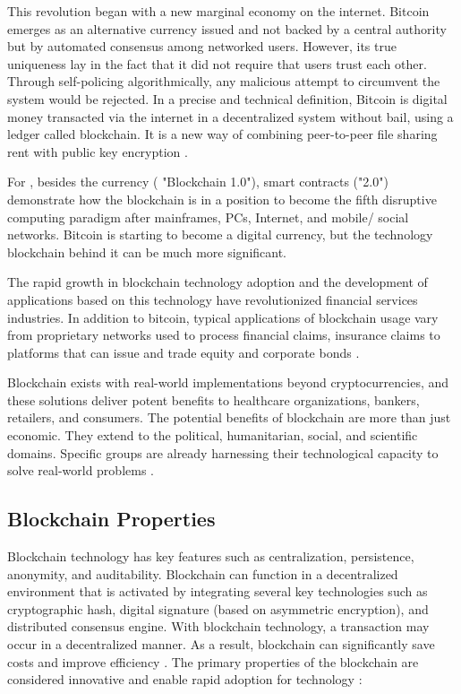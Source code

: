 This revolution began with a new marginal economy on the internet. Bitcoin emerges as an alternative currency issued and not backed by a central authority but by automated consensus among networked users. However, its true uniqueness lay in the fact that it did not require that users trust each other. Through self-policing algorithmically, any malicious attempt to circumvent the system would be rejected. In a precise and technical definition, Bitcoin is digital money transacted via the internet in a decentralized system without bail, using a ledger called blockchain. It is a new way of combining peer-to-peer file sharing rent with public key encryption \cite{swan2015blockchain}.

For \cite{swan2015blockchain}, besides the currency ( "Blockchain 1.0"), smart contracts ("2.0") demonstrate how the blockchain is in a position to become the fifth disruptive computing paradigm after mainframes, PCs, Internet, and mobile/ social networks. Bitcoin is starting to become a digital currency, but the technology blockchain behind it can be much more significant.

The rapid growth in blockchain technology adoption and the development of applications based on this technology have revolutionized financial services industries. In addition to bitcoin, typical applications of blockchain usage vary from proprietary networks used to process financial claims, insurance claims to platforms that can issue and trade equity and corporate bonds \cite{michael2018blockchain}.

Blockchain exists with real-world implementations beyond cryptocurrencies, and these solutions deliver potent benefits to healthcare organizations, bankers, retailers, and consumers. The potential benefits of blockchain are more than just economic. They extend to the political, humanitarian, social, and scientific domains. Specific groups are already harnessing their technological capacity to solve real-world problems \cite{michael2018blockchain}.



\subsection{Blockchain Properties}\label{sec:propriedades}

Blockchain technology has key features such as centralization, persistence, anonymity, and auditability. Blockchain can function in a decentralized environment that is activated by integrating several key technologies such as cryptographic hash, digital signature (based on asymmetric encryption), and distributed consensus engine. With blockchain technology, a transaction may occur in a decentralized manner. As a result, blockchain can significantly save costs and improve efficiency \cite{zheng2016blockchain}. The primary properties of the blockchain are considered innovative and enable rapid adoption for technology \cite{greve2018blockchain}:

